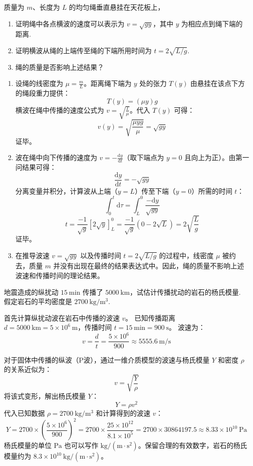\begin{exercise}\label{ex:8.2}
质量为 $m$、长度为 $L$ 的均匀绳垂直悬挂在天花板上，
\begin{enumerate}
  \item[(a)] 证明绳中各点横波的速度可以表示为 $v = \sqrt{gy}$，其中 $y$ 为相应点到绳下端的距离.
  \item[(b)] 证明横波从绳的上端传至绳的下端所用时间为 $t = 2\sqrt{L/g}$.
  \item[(c)] 绳的质量是否影响上述结果？
\end{enumerate}
\end{exercise}
\begin{solution}
\begin{enumerate}
    \item[(a)] 设绳的线密度为 $\mu = \frac{m}{L}$。距离绳下端为 $y$ 处的张力 $T(y)$ 由悬挂在该点下方的绳段重力提供：
    $$ T(y) = (\mu y) g $$
    横波在绳中传播的速度公式为 $v = \sqrt{\frac{T}{\mu}}$。代入 $T(y)$ 可得：
    $$ v(y) = \sqrt{\frac{\mu y g}{\mu}} = \sqrt{gy} $$
    证毕。

    \item[(b)] 波在绳中向下传播的速度为 $v = -\frac{\mathrm{d}y}{\mathrm{d}t}$（取下端点为 $y=0$ 且向上为正）。由第一问结果可得：
    $$ \frac{\mathrm{d}y}{\mathrm{d}t} = -\sqrt{gy} $$
    分离变量并积分，计算波从上端（$y = L$）传至下端（$y = 0$）所需的时间 $t$：
    $$ \int_0^t \mathrm{d}\tau = \int_L^0 \frac{-\mathrm{d}y}{\sqrt{gy}} $$
    $$ t = \frac{-1}{\sqrt{g}} \left[ 2\sqrt{y} \right]_L^0 = \frac{-1}{\sqrt{g}} (0 - 2\sqrt{L}) = 2\sqrt{\frac{L}{g}} $$
    证毕。

    \item[(c)] 在推导波速 $v = \sqrt{gy}$ 以及传播时间 $t = 2\sqrt{L/g}$ 的过程中，线密度 $\mu$ 被约去，质量 $m$ 并没有出现在最终的结果表达式中。因此，绳的质量不影响上述波速和传播时间的理论结果。
\end{enumerate}
\end{solution}

\begin{exercise}\label{ex:8.3}
地震造成的纵扰动 $15 \ \mathrm{min}$ 传播了 $5000 \ \mathrm{km}$，试估计传播扰动的岩石的杨氏模量. 假定岩石的平均密度是 $2700 \ \mathrm{kg/m^3}$.
\end{exercise}
\begin{solution}
首先计算纵扰动波在岩石中传播的波速 $v$。
已知传播距离 $d = 5000 \ \mathrm{km} = 5 \times 10^6 \ \mathrm{m}$，传播时间 $t = 15 \ \mathrm{min} = 900 \ \mathrm{s}$。
波速为：
$$ v = \frac{d}{t} = \frac{5 \times 10^6}{900} \approx 5555.6 \ \mathrm{m/s} $$

对于固体中传播的纵波（P波），通过一维介质模型的波速与杨氏模量 $Y$ 和密度 $\rho$ 的关系近似为：
$$ v = \sqrt{\frac{Y}{\rho}} $$
将该式变形，解出杨氏模量 $Y$：
$$ Y = \rho v^2 $$
代入已知数据 $\rho = 2700 \ \mathrm{kg/m^3}$ 和计算得到的波速 $v$：
$$ Y = 2700 \times \left( \frac{5 \times 10^6}{900} \right)^2 = 2700 \times \frac{25 \times 10^{12}}{8.1 \times 10^5} = 2700 \times 30864197.5 \approx 8.33 \times 10^{10} \ \mathrm{Pa} $$
杨氏模量的单位 $\mathrm{Pa}$ 也可以写作 $\mathrm{kg/(m \cdot s^2)}$。保留合理的有效数字，岩石的杨氏模量约为 $8.3 \times 10^{10} \ \mathrm{kg/(m \cdot s^2)}$。
\end{solution}

